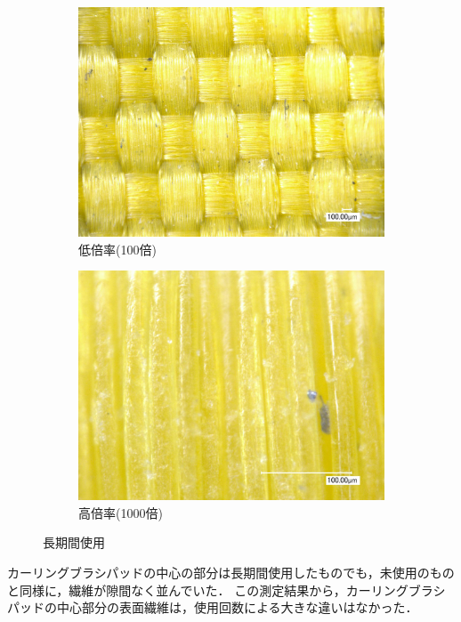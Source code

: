 \documentclass[main]{subfiles}
\begin{document}
\begin{figure}[H]
    \centering
    \begin{subfigure}[htbp]{0.45\linewidth}
        \centering
        \includegraphics[keepaspectratio, width=0.8\linewidth]{figures/中心/カーリングパッド長期低倍率.jpg}
        \caption{低倍率(100倍)}
        \label{fig:label}
    \end{subfigure}
    \begin{subfigure}[htbp]{0.45\linewidth}
        \centering
        \includegraphics[keepaspectratio, width=0.8\linewidth]{figures/中心/カーリングパッド長期.jpg}
        \caption{高倍率(1000倍)}
        \label{fig:label}
    \end{subfigure}
    \caption{長期間使用}
    \label{fig:7}
\end{figure}


カーリングブラシパッドの中心の部分は長期間使用したものでも，未使用のものと同様に，繊維が隙間なく並んでいた．
この測定結果から，カーリングブラシパッドの中心部分の表面繊維は，使用回数による大きな違いはなかった．
\end{document}
